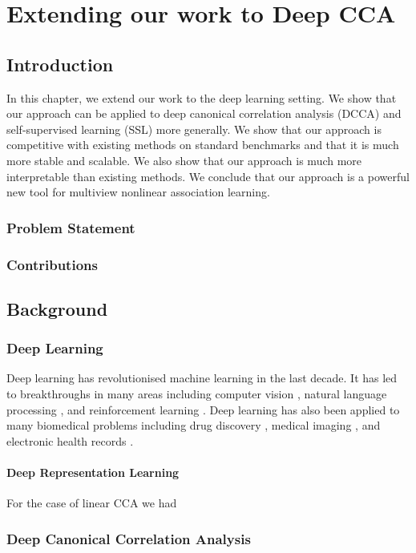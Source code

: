 \chapter{Extending our work to Deep CCA}
\minitoc
\section{Introduction}
In this chapter, we extend our work to the deep learning setting. We show that our approach can be applied to deep canonical correlation analysis (DCCA) and self-supervised learning (SSL) more generally. We show that our approach is competitive with existing methods on standard benchmarks and that it is much more stable and scalable. We also show that our approach is much more interpretable than existing methods. We conclude that our approach is a powerful new tool for multiview nonlinear association learning.

\subsection{Problem Statement}

\subsection{Contributions}


\section{Background}
\subsection{Deep Learning}
Deep learning has revolutionised machine learning in the last decade. It has led to breakthroughs in many areas including computer vision \cite{krizhevsky2012imagenet}, natural language processing \cite{devlin2018bert}, and reinforcement learning \cite{mnih2015human}. Deep learning has also been applied to many biomedical problems including drug discovery \cite{gawehn2016deep}, medical imaging \cite{litjens2017survey}, and electronic health records \cite{rajkomar2018scalable}.

\subsubsection{Deep Representation Learning}
For the case of linear CCA we had

\subsection{Deep Canonical Correlation Analysis}

